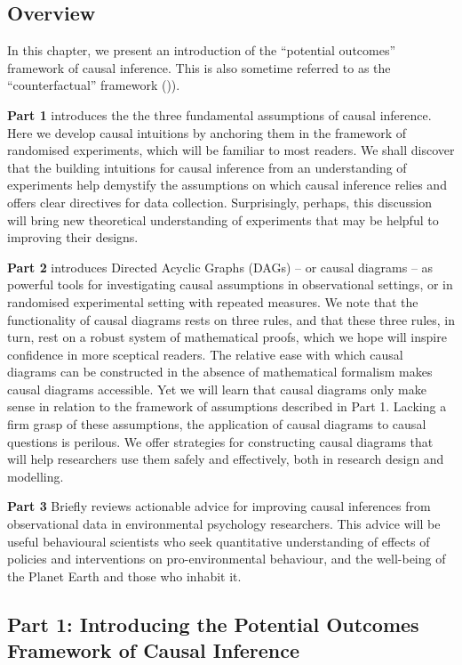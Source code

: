 \documentclass[
  singlecolumn]{article}
\begin{document}
\subsection{Overview}\label{overview}

In this chapter, we present an introduction of the ``potential
outcomes'' framework of causal inference. This is also sometime referred
to as the ``counterfactual'' framework ()).

\textbf{Part 1} introduces the the three fundamental assumptions of
causal inference. Here we develop causal intuitions by anchoring them in
the framework of randomised experiments, which will be familiar to most
readers. We shall discover that the building intuitions for causal
inference from an understanding of experiments help demystify the
assumptions on which causal inference relies and offers clear directives
for data collection. Surprisingly, perhaps, this discussion will bring
new theoretical understanding of experiments that may be helpful to
improving their designs.

\textbf{Part 2} introduces Directed Acyclic Graphs (DAGs) -- or causal
diagrams -- as powerful tools for investigating causal assumptions in
observational settings, or in randomised experimental setting with
repeated measures. We note that the functionality of causal diagrams
rests on three rules, and that these three rules, in turn, rest on a
robust system of mathematical proofs, which we hope will inspire
confidence in more sceptical readers. The relative ease with which
causal diagrams can be constructed in the absence of mathematical
formalism makes causal diagrams accessible. Yet we will learn that
causal diagrams only make sense in relation to the framework of
assumptions described in Part 1. Lacking a firm grasp of these
assumptions, the application of causal diagrams to causal questions is
perilous. We offer strategies for constructing causal diagrams that will
help researchers use them safely and effectively, both in research
design and modelling.

\textbf{Part 3} Briefly reviews actionable advice for improving causal
inferences from observational data in environmental psychology
researchers. This advice will be useful behavioural scientists who seek
quantitative understanding of effects of policies and interventions on
pro-environmental behaviour, and the well-being of the Planet Earth and
those who inhabit it.

\subsection{Part 1: Introducing the Potential Outcomes Framework of
Causal
Inference}\label{part-1-introducing-the-potential-outcomes-framework-of-causal-inference}
\end{document}
